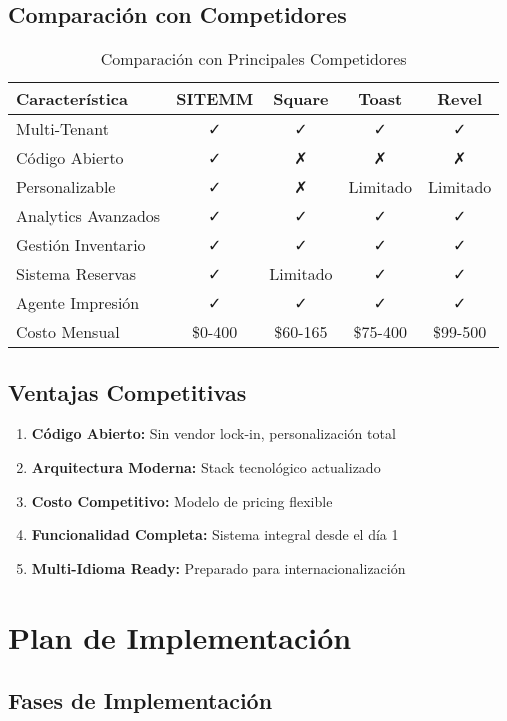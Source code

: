 \documentclass[12pt,a4paper]{article}
\begin{document}
\subsection{Comparación con Competidores}

\begin{table}[H]
\centering
\footnotesize
\begin{tabular}{@{}lcccc@{}}
\toprule
\textbf{Característica} & \textbf{SITEMM} & \textbf{Square} & \textbf{Toast} & \textbf{Revel} \\
\midrule
Multi-Tenant & ✓ & ✓ & ✓ & ✓ \\
Código Abierto & ✓ & ✗ & ✗ & ✗ \\
Personalizable & ✓ & ✗ & Limitado & Limitado \\
Analytics Avanzados & ✓ & ✓ & ✓ & ✓ \\
Gestión Inventario & ✓ & ✓ & ✓ & ✓ \\
Sistema Reservas & ✓ & Limitado & ✓ & ✓ \\
Agente Impresión & ✓ & ✓ & ✓ & ✓ \\
Costo Mensual & \$0-400 & \$60-165 & \$75-400 & \$99-500 \\
\bottomrule
\end{tabular}
\caption{Comparación con Principales Competidores}
\end{table}

\subsection{Ventajas Competitivas}

\begin{enumerate}
    \item \textbf{Código Abierto:} Sin vendor lock-in, personalización total
    \item \textbf{Arquitectura Moderna:} Stack tecnológico actualizado
    \item \textbf{Costo Competitivo:} Modelo de pricing flexible
    \item \textbf{Funcionalidad Completa:} Sistema integral desde el día 1
    \item \textbf{Multi-Idioma Ready:} Preparado para internacionalización
\end{enumerate}

\section{Plan de Implementación}

\subsection{Fases de Implementación}
\end{document}
